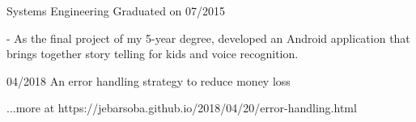\documentclass[11pt]{article} %
\begin{document}

\begin{description}
\squish
{}
           {Systems Engineering}
           {Graduated on 07/2015}

- As the final project of my 5-year degree, developed an Android application that brings together story telling for kids and voice recognition.

\end{description}


\squish

      {04/2018}
      {}
      {An error handling strategy to reduce money loss}

\hfill \small ...more at https://jebarsoba.github.io/2018/04/20/error-handling.html
\end{document}

